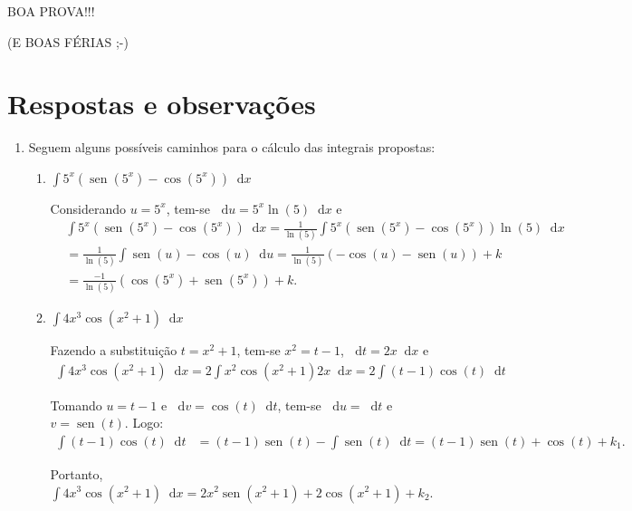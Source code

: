 \documentclass[12pt,a4paper]{article}
\newcommand*\diff{\mathop{}\!\mathrm{d}}
\newcommand*\sen{\operatorname{sen}}
\begin{document}
\begin{center}
BOA PROVA!!!
\end{center}
\begin{center}
(E BOAS FÉRIAS ;-)
\end{center}

\newpage
\section*{Respostas e observações}

\begin{enumerate}
\item Seguem alguns possíveis caminhos para o cálculo das integrais propostas:
\begin{enumerate}
\item $\displaystyle \int 5^x(\sen(5^x)-\cos(5^x)) \diff x$

Considerando $u = 5^x$, tem-se $\diff u = 5^x \ln(5) \diff x$ e
\begin{align*}
&   \int 5^x(\sen(5^x)-\cos(5^x)) \diff x
  = \frac{1}{\ln(5)} \int 5^x(\sen(5^x)-\cos(5^x)) \ln(5) \diff x\\
& = \frac{1}{\ln(5)} \int \sen(u) - \cos(u) \diff u
  = \frac{1}{\ln(5)} (-\cos(u) - \sen(u)) + k \\
& = \frac{-1}{\ln(5)} (\cos(5^x) + \sen(5^x)) + k.
\end{align*}

\item $\displaystyle \int 4x^3 \cos(x^2+1) \diff x$

Fazendo a substituição $t = x^2 + 1$, tem-se $x^2 = t-1$, $\diff t = 2x \diff x$ e
\begin{align*}
    \int 4x^3 \cos(x^2+1) \diff x
= 2 \int x^2 \cos(x^2+1) 2x \diff x
= 2 \int (t-1) \cos(t) \diff t
\end{align*}

Tomando $u = t-1$ e $\diff v = \cos(t) \diff t$, tem-se $\diff u = \diff t$ e $v = \sen(t)$. Logo:
\begin{align*}
  \int (t-1) \cos(t) \diff t
& = (t-1)\sen(t) - \int \sen(t) \diff t
  = (t-1)\sen(t) + \cos(t) + k_1.
\end{align*}

Portanto, $\int 4x^3 \cos(x^2+1) \diff x = 2 x^2 \sen(x^2+1) + 2\cos(x^2+1) + k_2$.


\end{enumerate}
\end{enumerate}
\end{document}
